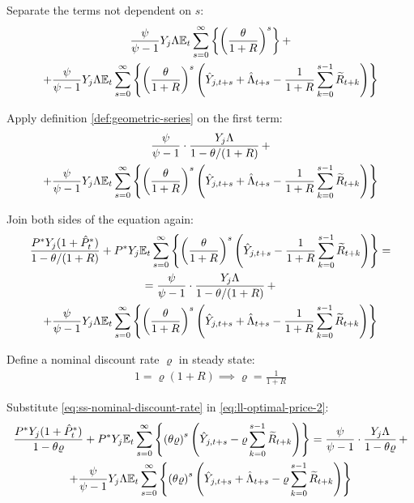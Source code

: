 \documentclass[
	thesis.tex
	]{subfiles}
\begin{document}
Separate the terms not dependent on $s$:
\begin{multline}
	\frac{\psi}{\psi-1} Y_{j} \Lambda {\mathbb{E}_{t}} \sum_{s=0}^{\infty} \left\{ \left( \frac{\theta}{1 + R} \right)^s \right\} + 
	\\
	+ \frac{\psi}{\psi-1} Y_{j} \Lambda {\mathbb{E}_{t}} \sum_{s=0}^{\infty} \left\{ \left( \frac{\theta}{1 + R} \right)^s \left( \hat{Y}_{j,t+s} + \hat{\Lambda}_{t+s} - \frac{1}{1 + R} \sum_{k=0}^{s-1} \widetilde{R}_{t+k} \right) \right\} \nonumber
\end{multline}

Apply definition \ref{def:geometric-series} on the first term:
\begin{multline}
	\frac{\psi}{\psi-1} \cdot \frac{Y_{j} \Lambda}{1-\theta /(1+R)} \, + 
	\\
	+ \frac{\psi}{\psi-1} Y_{j} \Lambda {\mathbb{E}_{t}} \sum_{s=0}^{\infty} \left\{ \left( \frac{\theta}{1 + R} \right)^s \left( \hat{Y}_{j,t+s} + \hat{\Lambda}_{t+s} - \frac{1}{1 + R} \sum_{k=0}^{s-1} \widetilde{R}_{t+k} \right) \right\} \nonumber
\end{multline}

Join both sides of the equation again:
\begin{multline}
	\frac{ P^\ast Y_{j} ( 1 + \hat{P}_t^\ast ) }{1-\theta /(1+R)} + P^\ast Y_{j} {\mathbb{E}_{t}} \sum_{s=0}^{\infty} \left\{ \left( \frac{\theta}{1 + R} \right)^s \left( \hat{Y}_{j,t+s} - \frac{1}{1 + R} \sum_{k=0}^{s-1} \widetilde{R}_{t+k} \right) \right\} = 
	\\
	= \frac{\psi}{\psi-1} \cdot \frac{Y_{j} \Lambda}{1-\theta /(1+R)} \, + 
	\\
	+ \frac{\psi}{\psi-1} Y_{j} \Lambda {\mathbb{E}_{t}} \sum_{s=0}^{\infty} \left\{ \left( \frac{\theta}{1 + R} \right)^s \left( \hat{Y}_{j,t+s} + \hat{\Lambda}_{t+s} - \frac{1}{1 + R} \sum_{k=0}^{s-1} \widetilde{R}_{t+k} \right) \right\} \label{eq:ll-optimal-price-2}
\end{multline}

Define a nominal discount rate $\varrho$ in steady state:
\begin{align}
	1 = \varrho (1 + R) \implies \varrho = \frac{1}{1 + R} \label{eq:ss-nominal-discount-rate}
\end{align}

Substitute \ref{eq:ss-nominal-discount-rate} in \ref{eq:ll-optimal-price-2}:
\begin{multline}
	\frac{ P^\ast Y_{j} ( 1 + \hat{P}_t^\ast ) }{1- \theta \varrho} + P^\ast Y_{j} {\mathbb{E}_{t}} \sum_{s=0}^{\infty} \left\{ \left( \theta \varrho \right)^s \left( \hat{Y}_{j,t+s} - \varrho \sum_{k=0}^{s-1} \widetilde{R}_{t+k} \right) \right\} = \frac{\psi}{\psi-1} \cdot \frac{Y_{j} \Lambda}{1- \theta \varrho } \, + 
	\\ 
	+ \frac{\psi}{\psi-1} Y_{j} \Lambda {\mathbb{E}_{t}} \sum_{s=0}^{\infty} \left\{ \left( \theta \varrho \right)^s \left( \hat{Y}_{j,t+s} + \hat{\Lambda}_{t+s} - \varrho \sum_{k=0}^{s-1} \widetilde{R}_{t+k} \right) \right\} \label{eq:ll-optimal-price-3}
\end{multline}
\end{document}
